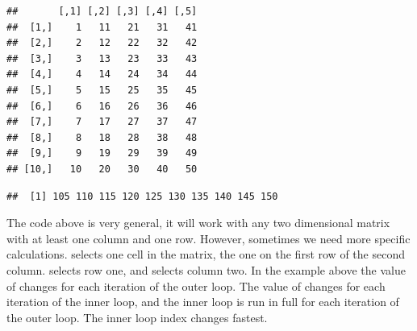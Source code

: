 \documentclass[krantz2]{krantz}\usepackage{knitr}%
\begin{document}
\begin{knitrout}\footnotesize
{}\color{fgcolor}\begin{kframe}
\begin{alltt}
 \hlkwb{<-} \hlstd{(}\hlopt{:}\hlstd{,} \hlstd{)}
\end{alltt}
\begin{verbatim}
##       [,1] [,2] [,3] [,4] [,5]
##  [1,]    1   11   21   31   41
##  [2,]    2   12   22   32   42
##  [3,]    3   13   23   33   43
##  [4,]    4   14   24   34   44
##  [5,]    5   15   25   35   45
##  [6,]    6   16   26   36   46
##  [7,]    7   17   27   37   47
##  [8,]    8   18   28   38   48
##  [9,]    9   19   29   39   49
## [10,]   10   20   30   40   50
\end{verbatim}
\end{kframe}
\end{knitrout}

\begin{knitrout}\footnotesize
{}\color{fgcolor}\begin{kframe}
\begin{alltt}
 \hlkwb{<-} \hlstd{()}
   \hlopt{:}
   \hlkwb{<-} 
     \hlopt{:}
     \hlkwb{<-}  \hlopt{+} 
\hlstd{\}}
\end{alltt}
\begin{verbatim}
##  [1] 105 110 115 120 125 130 135 140 145 150
\end{verbatim}
\end{kframe}
\end{knitrout}

The code above is very general, it will work with any two dimensional matrix with at least one column and one row. However, sometimes we need more specific calculations.  selects one cell in the matrix, the one on the first row of the second column.  selects row one, and   selects column two. In the example above the value of  changes for each iteration of the outer loop. The value of  changes for each iteration of the inner loop, and the inner loop is run in full for each iteration of the outer loop. The inner loop index  changes fastest.
\end{document}
